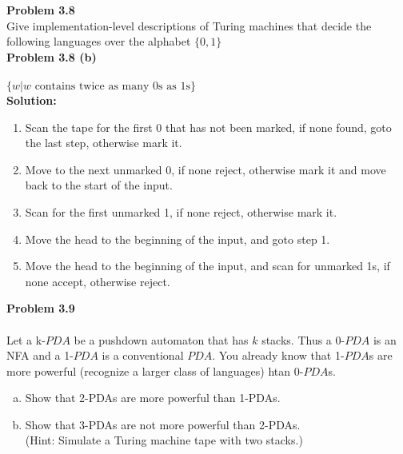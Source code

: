 \documentclass{article}
\newcommand\curl[1]{\{#1\}}
\newcommand{\problem}[1]{\large{\textbf{Problem #1}}\\}
\begin{document}
\pagebreak

\problem{3.8}

Give implementation-level descriptions of Turing machines that decide the 
following languages over the alphabet $\curl{0,1}$ \\ 

\problem{3.8   (b)} \\
$\curl{w | w \text{ contains twice as many 0s as 1s}}$ \\

\textbf{Solution:}\\
\begin{enumerate}[1., leftmargin = 1.5cm]
\itemsep0em
\item Scan the tape for the first 0 that has not been marked, if 
none found, goto the last step, otherwise mark it.
\item Move to the next unmarked 0, if none reject, otherwise mark it and
move back to the start of the input.
\item Scan for the first unmarked 1, if none reject, otherwise mark it.
\item  Move the head to the beginning of the input, and goto step 1.
\item Move the head to the beginning of the input, and scan for unmarked
1s, if none accept, otherwise reject. \\
\end{enumerate}

\problem{3.9} \\
Let a k-$PDA$ be a pushdown automaton that has $k$ stacks. Thus a 0-$PDA$
is an NFA and a 1-$PDA$ is a conventional $PDA$. You already know that 1-$PDA$s
are more powerful (recognize a larger class of languages) htan 0-$PDA$s.
\begin{enumerate}[a., leftmargin = 1.5cm]
\itemsep0em
\item Show that 2-PDAs are more powerful than 1-PDAs.
\item Show that 3-PDAs are not more powerful than 2-PDAs.\\
    (Hint: Simulate a Turing machine tape with two stacks.)
\end{enumerate}

\pagebreak
\end{document}
